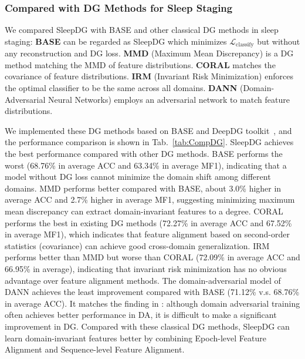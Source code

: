 \documentclass[letterpaper]{article} %
\begin{document}
	\subsubsection{Compared with DG Methods for Sleep Staging}
	\label{sec:dg}


	We compared SleepDG with BASE and other classical DG methods in sleep staging:
	\textbf{BASE} can be regarded as SleepDG which minimizes $\mathcal L_{\mathrm{classify}}$ but without any reconstruction and DG loss.
	\textbf{MMD} (Maximum Mean Discrepancy) \citep{tzeng2014deep, li2018domain} is a DG method matching the MMD of feature distributions.
	\textbf{CORAL} \citep{sun2016deep} matches the covariance of feature distributions.
	\textbf{IRM} (Invariant Risk Minimization) \citep{Arjovsky2019InvariantRM} enforces the optimal classifier to be the same across all domains.
	\textbf{DANN} (Domain-Adversarial Neural Networks) \citep{ganin2015unsupervised} employs an adversarial network to match feature distributions.

	We implemented these DG methods based on BASE and DeepDG toolkit~\citep{wang2022generalizing}, and the performance comparison is shown in Tab.~\ref{tab:CompDG}.
	SleepDG achieves the best performance compared with other DG methods.
	BASE performs the worst (68.76\% in average ACC and 63.34\% in average MF1), indicating that a model without DG loss cannot minimize the domain shift among different domains.
	MMD performs better compared with BASE, about 3.0\% higher in average ACC and 2.7\% higher in average MF1, suggesting minimizing maximum mean discrepancy can extract domain-invariant features to a degree.
	CORAL performs the best in existing DG methods (72.27\% in average ACC and 67.52\% in average MF1), which indicates that feature alignment based on second-order statistics (covariance) can achieve good cross-domain generalization.
	IRM performs better than MMD but worse than CORAL (72.09\% in average ACC and 66.95\% in average), indicating that invariant risk minimization has no obvious advantage over feature alignment methods.
	The domain-adversarial model of DANN achieves the least improvement compared with BASE (71.12\% v.s. 68.76\% in average ACC).
	It matches the finding in \citet{wang2022generalizing}: although domain adversarial training often achieves better performance in DA, it is difficult to make a significant improvement in DG.
	Compared with these classical DG methods, SleepDG can learn domain-invariant features better by combining Epoch-level Feature Alignment and Sequence-level Feature Alignment.
\end{document}
